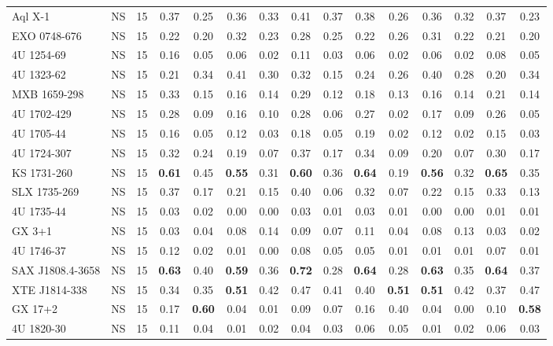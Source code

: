 {\begin{longtable}{@{}llr*{12}{c}@{}}
Aql X-1 & NS & 15 & 0.37 & 0.25 & 0.36 & 0.33 & 0.41 & 0.37 & 0.38 & 0.26 & 0.36 & 0.32 & 0.37 & 0.23 \\
EXO 0748-676 & NS & 15 & 0.22 & 0.20 & 0.32 & 0.23 & 0.28 & 0.25 & 0.22 & 0.26 & 0.31 & 0.22 & 0.21 & 0.20 \\
4U 1254-69 & NS & 15 & 0.16 & 0.05 & 0.06 & 0.02 & 0.11 & 0.03 & 0.06 & 0.02 & 0.06 & 0.02 & 0.08 & 0.05 \\
4U 1323-62 & NS & 15 & 0.21 & 0.34 & 0.41 & 0.30 & 0.32 & 0.15 & 0.24 & 0.26 & 0.40 & 0.28 & 0.20 & 0.34 \\
MXB 1659-298 & NS & 15 & 0.33 & 0.15 & 0.16 & 0.14 & 0.29 & 0.12 & 0.18 & 0.13 & 0.16 & 0.14 & 0.21 & 0.14 \\
4U 1702-429 & NS & 15 & 0.28 & 0.09 & 0.16 & 0.10 & 0.28 & 0.06 & 0.27 & 0.02 & 0.17 & 0.09 & 0.26 & 0.05 \\
4U 1705-44 & NS & 15 & 0.16 & 0.05 & 0.12 & 0.03 & 0.18 & 0.05 & 0.19 & 0.02 & 0.12 & 0.02 & 0.15 & 0.03 \\
4U 1724-307 & NS & 15 & 0.32 & 0.24 & 0.19 & 0.07 & 0.37 & 0.17 & 0.34 & 0.09 & 0.20 & 0.07 & 0.30 & 0.17 \\
KS 1731-260 & NS & 15 & \textbf{0.61} & 0.45 & \textbf{0.55} & 0.31 & \textbf{0.60} & 0.36 & \textbf{0.64} & 0.19 & \textbf{0.56} & 0.32 & \textbf{0.65} & 0.35 \\
SLX 1735-269 & NS & 15 & 0.37 & 0.17 & 0.21 & 0.15 & 0.40 & 0.06 & 0.32 & 0.07 & 0.22 & 0.15 & 0.33 & 0.13 \\
4U 1735-44 & NS & 15 & 0.03 & 0.02 & 0.00 & 0.00 & 0.03 & 0.01 & 0.03 & 0.01 & 0.00 & 0.00 & 0.01 & 0.01 \\
GX 3+1 & NS & 15 & 0.03 & 0.04 & 0.08 & 0.14 & 0.09 & 0.07 & 0.11 & 0.04 & 0.08 & 0.13 & 0.03 & 0.02 \\
4U 1746-37 & NS & 15 & 0.12 & 0.02 & 0.01 & 0.00 & 0.08 & 0.05 & 0.05 & 0.01 & 0.01 & 0.01 & 0.07 & 0.01 \\
SAX J1808.4-3658 & NS & 15 & \textbf{0.63} & 0.40 & \textbf{0.59} & 0.36 & \textbf{0.72} & 0.28 & \textbf{0.64} & 0.28 & \textbf{0.63} & 0.35 & \textbf{0.64} & 0.37 \\
XTE J1814-338 & NS & 15 & 0.34 & 0.35 & \textbf{0.51} & 0.42 & 0.47 & 0.41 & 0.40 & \textbf{0.51} & \textbf{0.51} & 0.42 & 0.37 & 0.47 \\
GX 17+2 & NS & 15 & 0.17 & \textbf{0.60} & 0.04 & 0.01 & 0.09 & 0.07 & 0.16 & 0.40 & 0.04 & 0.00 & 0.10 & \textbf{0.58} \\
4U 1820-30 & NS & 15 & 0.11 & 0.04 & 0.01 & 0.02 & 0.04 & 0.03 & 0.06 & 0.05 & 0.01 & 0.02 & 0.06 & 0.03 \\

\end{longtable}}
